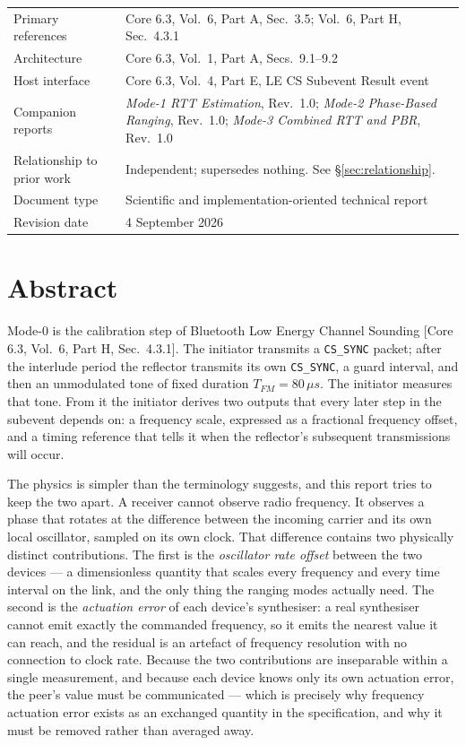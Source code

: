 \documentclass[11pt,a4paper]{article}
\newcommand{\us}{\,\ensuremath{\upmu}s}
\newcommand{\Tfm}{T_{FM}}
\newcommand{\code}[1]{\texttt{\small #1}}
\providecommand{\upmu}{\mu}
\newcommand{\core}[1]{\textcolor{rulegrey}{\small[Core 6.3, #1]}}
\begin{document}
\vfill
\noindent
\begin{tabular}{@{}L{40mm}L{95mm}@{}}
Primary references & Core 6.3, Vol.\ 6, Part A, Sec.\ 3.5; Vol.\ 6, Part H, Sec.\ 4.3.1 \\
Architecture & Core 6.3, Vol.\ 1, Part A, Secs.\ 9.1--9.2 \\
Host interface & Core 6.3, Vol.\ 4, Part E, LE CS Subevent Result event \\
Companion reports & \emph{Mode-1 RTT Estimation}, Rev.\ 1.0;
                    \emph{Mode-2 Phase-Based Ranging}, Rev.\ 1.0;
                    \emph{Mode-3 Combined RTT and PBR}, Rev.\ 1.0 \\
Relationship to prior work & Independent; supersedes nothing. See \S\ref{sec:relationship}. \\
Document type & Scientific and implementation-oriented technical report \\
Revision date & 4 September 2026 \\
\end{tabular}

\newpage
{}

\section*{Abstract}

Mode-0 is the calibration step of Bluetooth Low Energy Channel Sounding
\core{Vol.\ 6, Part H, Sec.\ 4.3.1}. The initiator transmits a \code{CS\_SYNC} packet; after the
interlude period the reflector transmits its own \code{CS\_SYNC}, a guard interval, and then an
unmodulated tone of fixed duration $\Tfm = 80\us$. The initiator measures that tone. From it the
initiator derives two outputs that every later step in the subevent depends on: a frequency scale,
expressed as a fractional frequency offset, and a timing reference that tells it when the reflector's
subsequent transmissions will occur.

The physics is simpler than the terminology suggests, and this report tries to keep the two apart. A
receiver cannot observe radio frequency. It observes a phase that rotates at the difference between
the incoming carrier and its own local oscillator, sampled on its own clock. That difference contains
two physically distinct contributions. The first is the \emph{oscillator rate offset} between the two
devices --- a dimensionless quantity that scales every frequency and every time interval on the link,
and the only thing the ranging modes actually need. The second is the \emph{actuation error} of each
device's synthesiser: a real synthesiser cannot emit exactly the commanded frequency, so it emits the
nearest value it can reach, and the residual is an artefact of frequency resolution with no
connection to clock rate. Because the two contributions are inseparable within a single measurement,
and because each device knows only its own actuation error, the peer's value must be communicated ---
which is precisely why frequency actuation error exists as an exchanged quantity in the
specification, and why it must be removed rather than averaged away.
\end{document}
